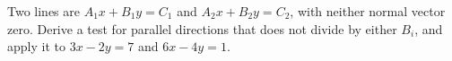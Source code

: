 Two lines are $A_1x+B_1y=C_1$ and $A_2x+B_2y=C_2$, with neither normal vector zero. Derive a test for parallel directions that does not divide by either $B_i$, and apply it to $3x-2y=7$ and $6x-4y=1$.
